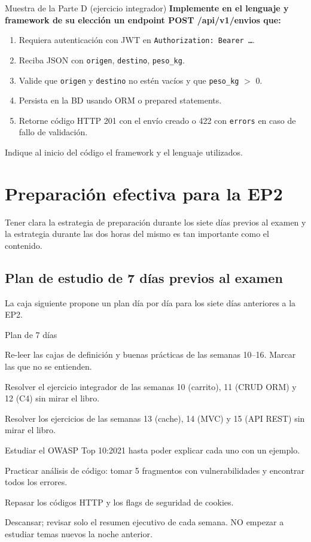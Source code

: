 \documentclass[11pt,a4paper,openany]{book}
\begin{document}
\begin{cajaejemplo}{Muestra de la Parte D (ejercicio integrador)}
\textbf{Implemente en el lenguaje y framework de su elección un
endpoint POST /api/v1/envios que:}

\begin{enumerate}
\item Requiera autenticación con JWT en \texttt{Authorization: Bearer
\dots}.
\item Reciba JSON con \texttt{origen}, \texttt{destino},
\texttt{peso\_kg}.
\item Valide que \texttt{origen} y \texttt{destino} no estén vacíos
y que \texttt{peso\_kg} $>$ 0.
\item Persista en la BD usando ORM o prepared statements.
\item Retorne código HTTP 201 con el envío creado o 422 con
\texttt{errors} en caso de fallo de validación.
\end{enumerate}

Indique al inicio del código el framework y el lenguaje utilizados.
\end{cajaejemplo}

\section{Preparación efectiva para la EP2}

Tener clara la estrategia de preparación durante los siete
días previos al examen y la estrategia durante las dos horas del
mismo es tan importante como el contenido.


\subsection{Plan de estudio de 7 días previos al examen}

La caja siguiente propone un plan día por día para los
siete días anteriores a la EP2.


\begin{cajabuenas}{Plan de 7 días}
\begin{description}[leftmargin=1.5cm]
\item[Día -7:] Re-leer las cajas de definición y buenas prácticas
de las semanas 10--16. Marcar las que no se entienden.
\item[Día -6:] Resolver el ejercicio integrador de las semanas 10
(carrito), 11 (CRUD ORM) y 12 (C4) sin mirar el libro.
\item[Día -5:] Resolver los ejercicios de las semanas 13 (cache),
14 (MVC) y 15 (API REST) sin mirar el libro.
\item[Día -4:] Estudiar el OWASP Top 10:2021 hasta poder explicar
cada uno con un ejemplo.
\item[Día -3:] Practicar análisis de código: tomar 5 fragmentos
con vulnerabilidades y encontrar todos los errores.
\item[Día -2:] Repasar los códigos HTTP y los flags de seguridad de
cookies.
\item[Día -1:] Descansar; revisar solo el resumen ejecutivo de cada
semana. NO empezar a estudiar temas nuevos la noche anterior.
\end{description}
\end{cajabuenas}
\end{document}
